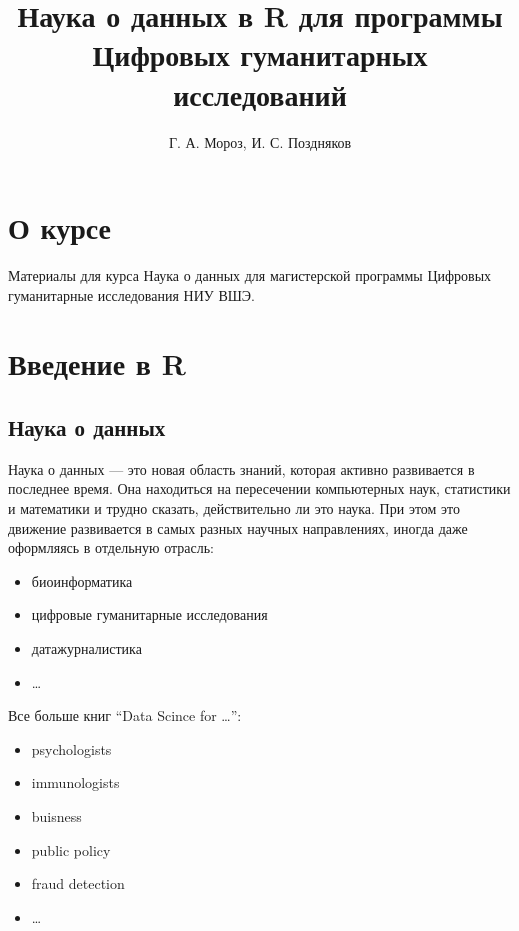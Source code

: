 \documentclass[]{book}
\title{Наука о данных в R для программы Цифровых гуманитарных исследований}
\author{Г. А. Мороз, И. С. Поздняков}
\date{}
\providecommand{\tightlist}{%
  \setlength{\itemsep}{0pt}\setlength{\parskip}{0pt}}
\begin{document}
\maketitle

{
\setcounter{tocdepth}{1}
\tableofcontents
}
\hypertarget{section}{%
\chapter{О курсе}\label{section}}

Материалы для курса Наука о данных для магистерской программы Цифровых гуманитарные исследования НИУ ВШЭ.

\hypertarget{intro}{%
\chapter{Введение в R}\label{intro}}

\hypertarget{section-1}{%
\section{Наука о данных}\label{section-1}}

Наука о данных --- это новая область знаний, которая активно развивается в последнее время. Она находиться на пересечении компьютерных наук, статистики и математики и трудно сказать, действительно ли это наука. При этом это движение развивается в самых разных научных направлениях, иногда даже оформляясь в отдельную отрасль:

\begin{itemize}
\tightlist
\item
  биоинформатика
\item
  цифровые гуманитарные исследования
\item
  датажурналистика
\item
  \ldots{}
\end{itemize}

Все больше книг ``Data Scince for \ldots{}'':

\begin{itemize}
\tightlist
\item
  psychologists \citep{hansjoerg19}
\item
  immunologists \citep{thomas19}
\item
  buisness \citep{provost13}
\item
  public policy \citep{brooks13}
\item
  fraud detection \citep{baesens15}
\item
  \ldots{}
\end{itemize}
\end{document}
